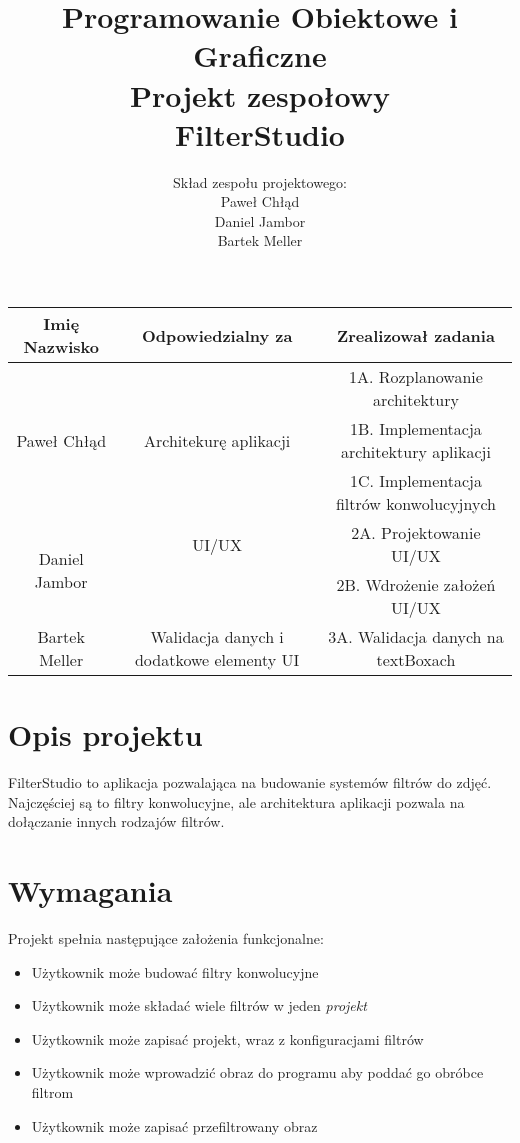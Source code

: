 \documentclass{article}
\title{Programowanie Obiektowe i Graficzne\\
Projekt zespołowy\\
\textbf{FilterStudio}}
\author{Skład zespołu projektowego: \\ Paweł Chłąd\\Daniel Jambor\\ Bartek Meller }
\begin{document}
\maketitle

\begin{center}
    \begin{tabular}{ |c|c|c| }
        \hline
        Imię Nazwisko                  & Odpowiedzialny za                        & Zrealizował zadania                      \\ \hline
        \multirow{3}{*}{Paweł Chłąd}   &                                          & 1A. Rozplanowanie architektury           \\
                                       & Architekurę aplikacji                    & 1B. Implementacja architektury aplikacji \\
                                       &                                          & 1C. Implementacja filtrów konwolucyjnych \\ \hline
        \multirow{2}{*}{Daniel Jambor} & UI/UX                                    & 2A. Projektowanie UI/UX                  \\
                                       &                                          & 2B. Wdrożenie założeń UI/UX              \\ \hline
        Bartek Meller                  & Walidacja danych i dodatkowe elementy UI & 3A. Walidacja danych na textBoxach       \\ \hline
    \end{tabular}
\end{center}

\pagebreak


\section{Opis projektu}
FilterStudio to aplikacja pozwalająca na budowanie systemów filtrów do zdjęć. Najczęściej są to filtry konwolucyjne, ale architektura aplikacji pozwala
na dołączanie innych rodzajów filtrów.
\section{Wymagania}
Projekt spełnia następujące założenia funkcjonalne:
\begin{itemize}
    \item Użytkownik może budować filtry konwolucyjne
    \item Użytkownik może składać wiele filtrów w jeden \textit{projekt}
    \item Użytkownik może zapisać projekt, wraz z konfiguracjami filtrów
    \item Użytkownik może wprowadzić obraz do programu aby poddać go obróbce filtrom
    \item Użytkownik może zapisać przefiltrowany obraz 
\end{itemize}
\end{document}
